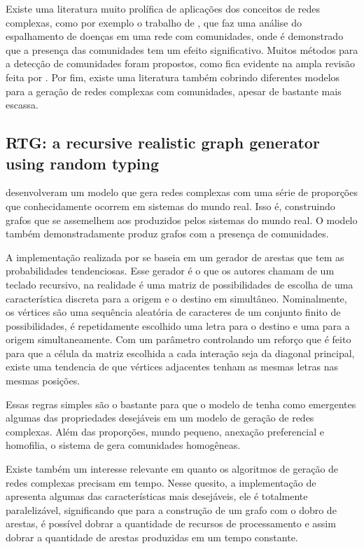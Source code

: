 \documentclass[notes.tex]{subfiles}
\begin{document}
Existe uma literatura muito prolífica de aplicações dos conceitos de redes complexas, como por exemplo o trabalho de , que faz uma análise do espalhamento de doenças em uma rede com comunidades, onde é demonstrado que a presença das comunidades tem um efeito significativo.
Muitos métodos para a detecção de comunidades foram propostos, como fica evidente na ampla revisão feita por .
Por fim, existe uma literatura também cobrindo diferentes modelos para a geração de redes complexas com comunidades, apesar de bastante mais escassa.

\subsection{RTG: a recursive realistic graph generator using random typing}

 desenvolveram um modelo que gera redes complexas com uma série de proporções que conhecidamente ocorrem em sistemas do mundo real.
Isso é, construindo grafos que se assemelhem aos produzidos pelos sistemas do mundo real.
O modelo também demonstradamente produz grafos com a presença de comunidades.

A implementação realizada por  se baseia em um gerador de arestas que tem as probabilidades tendenciosas.
Esse gerador é o que os autores chamam de um teclado recursivo, na realidade é uma matriz de possibilidades de escolha de uma característica discreta para a origem e o destino em simultâneo.
Nominalmente, os vértices são uma sequência aleatória de caracteres de um conjunto finito de possibilidades, é repetidamente escolhido uma letra para o destino e uma para a origem simultaneamente.
Com um parâmetro controlando um reforço que é feito para que a célula da matriz escolhida a cada interação seja da diagonal principal, existe uma tendencia de que vértices adjacentes tenham as mesmas letras nas mesmas posições.

Essas regras simples são o bastante para que o modelo de  tenha como emergentes algumas das propriedades desejáveis em um modelo de geração de redes complexas.
Além das proporções, mundo pequeno, anexação preferencial e homofilia, o sistema de  gera comunidades homogêneas.

Existe também um interesse relevante em quanto os algoritmos de geração de redes complexas precisam em tempo.
Nesse quesito, a implementação de  apresenta algumas das características mais desejáveis, ele é totalmente paralelizável, significando que para a construção de um grafo com o dobro de arestas, é possível dobrar a quantidade de recursos de processamento e assim dobrar a quantidade de arestas produzidas em um tempo constante.
\end{document}
